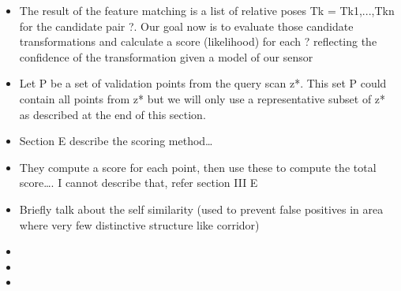 \begin{itemize}
    \item The result of the feature matching is a list of relative poses Tk = Tk1,...,Tkn for the candidate pair ?. Our goal now is to evaluate those candidate transformations and calculate a score (likelihood) for each ? reflecting the confidence of the transformation given a model of our sensor
    \item Let P be a set of validation points from the query scan z*. This set P could contain all points from z* but we will only use a representative subset of z* as described at the end of this section.
    \item Section E describe the scoring method\dots 
    \item They compute a score for each point, then use these to compute the total score\dots. I cannot describe that, refer section III E
    \item Briefly talk about the self similarity (used to prevent false positives in area where very few distinctive structure like corridor)
    \item 
    \item 
    \item 
\end{itemize}

